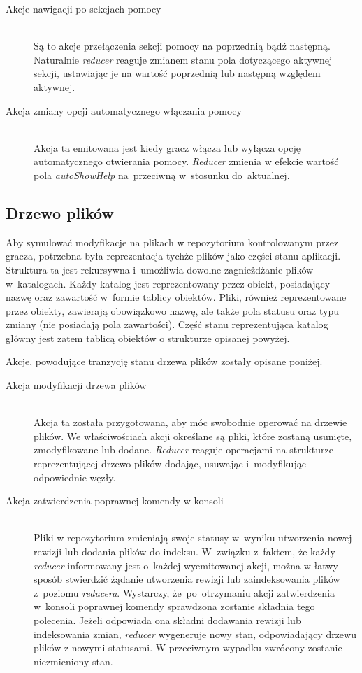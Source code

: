 \documentclass[12pt,a4paper,polish,thesis]{dcsbook}
\begin{document}
{\begin{description}
	\item[Akcje nawigacji po sekcjach pomocy] \hfill \\
	Są to akcje przełączenia sekcji pomocy na poprzednią bądź następną. Naturalnie \textit{reducer} reaguje zmianem stanu pola dotyczącego aktywnej sekcji, ustawiając je na wartość poprzednią lub następną względem aktywnej.
	
	\item[Akcja zmiany opcji automatycznego włączania pomocy] \hfill \\
	Akcja ta emitowana jest kiedy gracz włącza lub wyłącza opcję automatycznego otwierania pomocy. \textit{Reducer} zmienia w efekcie wartość pola \textit{autoShowHelp} na~przeciwną w~stosunku do~aktualnej.
	\end{description}
	
	\subsection{Drzewo plików} \label{DrzewoStan}
	
	Aby symulować modyfikacje na plikach w repozytorium kontrolowanym przez gracza, potrzebna była reprezentacja tychże plików jako części stanu aplikacji. Struktura ta jest rekursywna i~umożliwia dowolne zagnieżdżanie plików w~katalogach. Każdy katalog jest reprezentowany przez obiekt, posiadający nazwę oraz zawartość w~formie tablicy obiektów. Pliki, również reprezentowane przez obiekty, zawierają obowiązkowo nazwę, ale także pola statusu oraz typu zmiany (nie posiadają pola zawartości). Część stanu reprezentująca katalog główny jest zatem tablicą obiektów o strukturze opisanej powyżej.
	
	Akcje, powodujące tranzycję stanu drzewa plików zostały opisane poniżej.
	
	\begin{description}
	\item[Akcja modyfikacji drzewa plików] \hfill \\
	Akcja ta została przygotowana, aby móc swobodnie operować na drzewie plików. We właściwościach akcji określane są pliki, które zostaną usunięte, zmodyfikowane lub dodane. \textit{Reducer} reaguje operacjami na strukturze reprezentującej drzewo plików dodając, usuwając i~modyfikując odpowiednie węzły.
	
	\item[Akcja zatwierdzenia poprawnej komendy w konsoli] \hfill \\
	Pliki w repozytorium zmieniają swoje statusy w~wyniku utworzenia nowej rewizji lub dodania plików do indeksu. W~związku z~faktem, że każdy \textit{reducer} informowany jest o~każdej wyemitowanej akcji, można w łatwy sposób stwierdzić żądanie utworzenia rewizji lub zaindeksowania plików z~poziomu \textit{reducera}. Wystarczy, że~po~otrzymaniu akcji zatwierdzenia w~konsoli poprawnej komendy sprawdzona zostanie składnia tego polecenia. Jeżeli odpowiada ona składni dodawania rewizji lub indeksowania zmian, \textit{reducer} wygeneruje nowy stan, odpowiadający drzewu plików z nowymi statusami. W przeciwnym wypadku zwrócony zostanie niezmieniony stan.
	\end{description}
	
}
\end{document}
